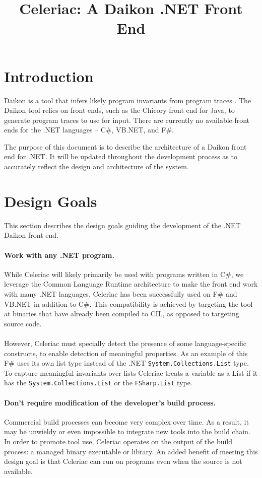 \documentclass{article}
\title{Celeriac: A Daikon .NET Front End}
\begin{document}
\maketitle

\section{Introduction}
Daikon is a tool that infers likely program invariants from program traces \cite{DaikonUserManual:Online}. The Daikon tool relies on front ends, such as the Chicory front end for Java, to generate program traces to use for input. There are currently no available front ends for the .NET languages -- C\#, VB.NET, and F\#.

The purpose of this document is to describe the architecture of a Daikon front end for .NET. It will be updated throughout the development process as to accurately reflect the design and architecture of the system.

\section{Design Goals}
This section describes the design goals guiding the development of the .NET Daikon front end.

\paragraph{Work with any .NET program.}
While Celeriac will likely primarily be used with programs written in C\#, we leverage the Common Language Runtime architecture to make the front end work with many .NET languages. Celeriac has been successfully used on F\# and VB.NET in addition to C\#. This compatibility is achieved by targeting the tool at binaries that have already been compiled to CIL, as opposed to targeting source code.
\\ \\
However, Celeriac must specially detect the presence of some language-specific constructs, to enable detection of meaningful properties. As an example of this F\# uses its own list type instead of the .NET \texttt{System.Collections.List} type. To capture meaningful invariants over lists Celeriac treats a variable as a List if it has the \texttt{System.Collections.List} or the \texttt{FSharp.List} type.

\paragraph{Don't require modification of the developer's build process.}
Commercial build processes can become very complex over time. As a result, it may be unwieldy or even impossible to integrate new tools into the build chain. In order to promote tool use, Celeriac operates on the output of the build process: a managed binary executable or library. An added benefit of meeting this design goal is that Celeriac can run on programs even when the source is not available.
\end{document}
